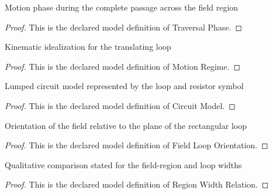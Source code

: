 \begin{definition}
  \label{def:physics:phyx-mini-0973:phyxminiproblems-problemphyxmini0973-traversalphase}
  Motion phase during the complete passage across the field region
\end{definition}
\begin{proof}
  This is the declared model definition of Traversal Phase.
\end{proof}
\begin{definition}
  \label{def:physics:phyx-mini-0973:phyxminiproblems-problemphyxmini0973-motionregime}
  Kinematic idealization for the translating loop
\end{definition}
\begin{proof}
  This is the declared model definition of Motion Regime.
\end{proof}
\begin{definition}
  \label{def:physics:phyx-mini-0973:phyxminiproblems-problemphyxmini0973-circuitmodel}
  Lumped circuit model represented by the loop and resistor symbol
\end{definition}
\begin{proof}
  This is the declared model definition of Circuit Model.
\end{proof}
\begin{definition}
  \label{def:physics:phyx-mini-0973:phyxminiproblems-problemphyxmini0973-fieldlooporientation}
  Orientation of the field relative to the plane of the rectangular loop
\end{definition}
\begin{proof}
  This is the declared model definition of Field Loop Orientation.
\end{proof}
\begin{definition}
  \label{def:physics:phyx-mini-0973:phyxminiproblems-problemphyxmini0973-regionwidthrelation}
  Qualitative comparison stated for the field-region and loop widths
\end{definition}
\begin{proof}
  This is the declared model definition of Region Width Relation.
\end{proof}
